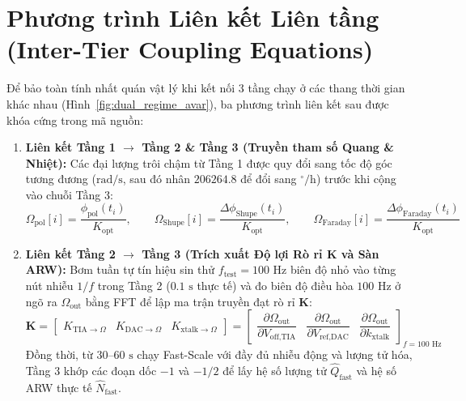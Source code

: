 \documentclass[11pt, a4paper]{article}
\begin{document}
\section{Phương trình Liên kết Liên tầng (Inter-Tier Coupling Equations)}

Để bảo toàn tính nhất quán vật lý khi kết nối 3 tầng chạy ở các thang thời gian khác nhau (Hình~\ref{fig:dual_regime_avar}), ba phương trình liên kết sau được khóa cứng trong mã nguồn:

\begin{enumerate}
    \item \textbf{Liên kết Tầng 1 $\rightarrow$ Tầng 2 \& Tầng 3 (Truyền tham số Quang \& Nhiệt):}
    Các đại lượng trôi chậm từ Tầng 1 được quy đổi sang tốc độ góc tương đương ($\text{rad/s}$, sau đó nhân $206264.8$ để đổi sang $^\circ/\text{h}$) trước khi cộng vào chuỗi Tầng 3:
    \begin{equation}
    \Omega_{\text{pol}}[i] = \frac{\phi_{\text{pol}}(t_i)}{K_{\text{opt}}}, \qquad
    \Omega_{\text{Shupe}}[i] = \frac{\Delta\phi_{\text{Shupe}}(t_i)}{K_{\text{opt}}}, \qquad
    \Omega_{\text{Faraday}}[i] = \frac{\Delta\phi_{\text{Faraday}}(t_i)}{K_{\text{opt}}}
    \end{equation}

    \item \textbf{Liên kết Tầng 2 $\rightarrow$ Tầng 3 (Trích xuất Độ lợi Rò rỉ $\mathbf{K}$ và Sàn ARW):}
    Bơm tuần tự tín hiệu sin thử $f_{\text{test}} = 100\text{ Hz}$ biên độ nhỏ vào từng nút nhiễu $1/f$ trong Tầng 2 ($0.1\text{ s}$ thực tế) và đo biên độ điều hòa $100\text{ Hz}$ ở ngõ ra $\Omega_{\text{out}}$ bằng FFT để lập ma trận truyền đạt rò rỉ $\mathbf{K}$:
    \begin{equation}
    \mathbf{K} = \begin{bmatrix} K_{\text{TIA}\to\Omega} & K_{\text{DAC}\to\Omega} & K_{\text{xtalk}\to\Omega} \end{bmatrix}
    = \begin{bmatrix}
    \dfrac{\partial\Omega_{\text{out}}}{\partial V_{\text{off,TIA}}} &
    \dfrac{\partial\Omega_{\text{out}}}{\partial V_{\text{ref,DAC}}} &
    \dfrac{\partial\Omega_{\text{out}}}{\partial k_{\text{xtalk}}}
    \end{bmatrix}_{f = 100\text{ Hz}}
    \end{equation}
    Đồng thời, từ $30\text{--}60\text{ s}$ chạy Fast-Scale với đầy đủ nhiễu động và lượng tử hóa, Tầng 3 khớp các đoạn dốc $-1$ và $-1/2$ để lấy hệ số lượng tử $\hat{Q}_{\text{fast}}$ và hệ số ARW thực tế $\hat{N}_{\text{fast}}$.


\end{enumerate}
\end{document}

